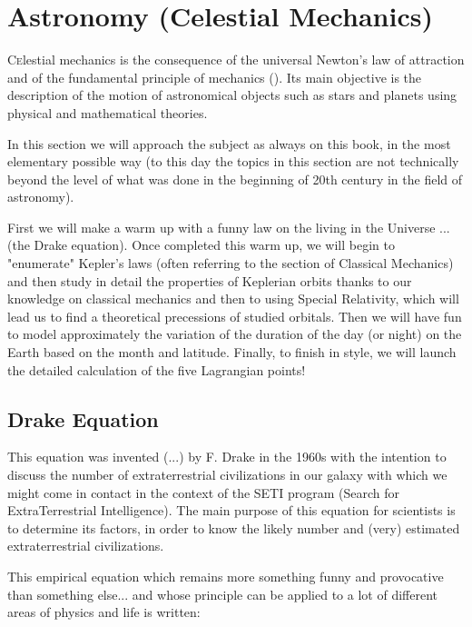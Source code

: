 	\newpage
	\thispagestyle{empty}
	\mbox{}
	\section{Astronomy (Celestial Mechanics)}
	\lettrine[lines=4]{\color{BrickRed}C}elestial mechanics is the consequence of the universal Newton's law of attraction  and of the fundamental principle of mechanics (). Its main objective is the description of the motion of astronomical objects such as stars and planets using physical and mathematical theories.
	
	In this section we will approach the subject as always on this book, in the most elementary  possible way (to this day the topics in this section are not technically beyond the level of what was done in the beginning of 20th century in the field of astronomy).
	
	First we will make a warm up with a funny law on the living in the Universe ... (the Drake equation). Once completed this warm up, we will begin to "enumerate" Kepler's laws (often referring to the section of Classical Mechanics) and then study in detail the properties of Keplerian orbits thanks to our knowledge on classical mechanics and then to using Special Relativity, which will lead us to find a theoretical precessions of studied orbitals. Then we will have fun to model approximately the variation of the duration of the day (or night) on the Earth based on the month and latitude. Finally, to finish in style, we will launch the detailed calculation of the five Lagrangian points!
	
	\subsection{Drake Equation}
	
	This equation was invented (...) by F. Drake in the 1960s with the intention to discuss the number of extraterrestrial civilizations in our galaxy with which we might come in contact in the context of the SETI program (Search for ExtraTerrestrial Intelligence). The main purpose of this equation for scientists is to determine its factors, in order to know the likely number and (very) estimated extraterrestrial civilizations.
	
	This empirical equation which remains more something funny and provocative than something else... and  whose principle can be applied to a lot of different areas of physics and life is written:
	
